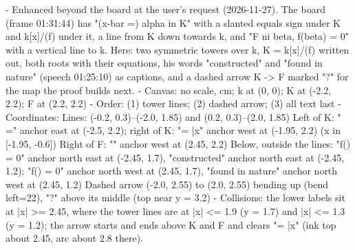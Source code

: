 \begin{proofWrapper}
\begin{content}
\begin{hidden}
- Enhanced beyond the board at the user's request (2026-11-27). The board (frame 01:31:44) has "(x-bar =) alpha in K" with a slanted equals sign under K and k[x]/(f) under it, a line from K down towards k, and "F ni beta, f(beta) = 0" with a vertical line to k. Here: two symmetric towers over k, K = k[x]/(f) written out, both roots with their equations, his words "constructed" and "found in nature" (speech 01:25:10) as captions, and a dashed arrow K -> F marked "?" for the map the proof builds next.
- Canvas: no scale, cm; k at (0, 0); K at (-2.2, 2.2); F at (2.2, 2.2)
- Order: (1) tower lines; (2) dashed arrow; (3) all text last
- Coordinates:
  Lines: (-0.2, 0.3)--(-2.0, 1.85) and (0.2, 0.3)--(2.0, 1.85)
  Left of K: " =" anchor east at (-2.5, 2.2); right of K: "\ni \alpha = \bar{x}" anchor west at (-1.95, 2.2) (x in [-1.95, -0.6])
  Right of F: "\ni \beta" anchor west at (2.45, 2.2)
  Below, outside the lines: "f(\alpha) = 0" anchor north east at (-2.45, 1.7), "constructed" anchor north east at (-2.45, 1.2); "f(\beta) = 0" anchor north west at (2.45, 1.7), "found in nature" anchor north west at (2.45, 1.2)
  Dashed arrow (-2.0, 2.55) to (2.0, 2.55) bending up (bend left=22), "?" above its middle (top near y = 3.2)
- Collisions: the lower labels sit at |x| >= 2.45, where the tower lines are at |x| <= 1.9 (y = 1.7) and |x| <= 1.3 (y = 1.2); the arrow starts and ends above K and F and clears "\ni \alpha = \bar{x}" (ink top about 2.45, arc about 2.8 there).
\end{hidden}
\begin{center}
\end{center}
\end{content}
\end{proofWrapper}
